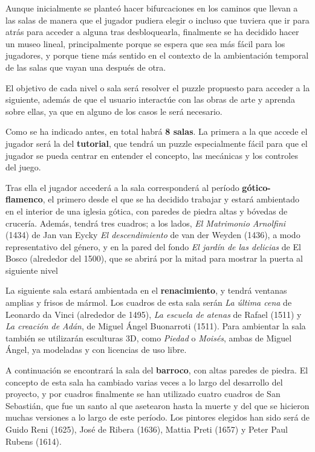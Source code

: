 Aunque inicialmente se planteó hacer bifurcaciones en los caminos que llevan a las salas de manera que el jugador pudiera elegir o incluso que tuviera que ir para atrás para acceder a alguna tras desbloquearla, finalmente se ha decidido hacer un museo lineal, principalmente porque se espera que sea más fácil para los jugadores, y porque tiene más sentido en el contexto de la ambientación temporal de las salas que vayan una después de otra.

El objetivo de cada nivel o sala será resolver el puzzle propuesto para acceder a la siguiente, además de que el usuario interactúe con las obras de arte y aprenda sobre ellas, ya que en alguno de los casos le será necesario.

Como se ha indicado antes, en total habrá \textbf{8 salas}. La primera a la que accede el jugador será la del \textbf{tutorial}, que tendrá un puzzle especialmente fácil para que el jugador se pueda centrar en entender el concepto, las mecánicas y los controles del juego.

Tras ella el jugador accederá a la sala corresponderá al período \textbf{gótico-flamenco}, el primero desde el que se ha decidido trabajar y estará ambientado en el interior de una iglesia gótica, con paredes de piedra altas y bóvedas de crucería. Además, tendrá tres cuadros; a los lados, \textit{El Matrimonio Arnolfini} (1434)  de Jan van Eycky \textit{El descendimiento} de van der Weyden (1436), a modo representativo del género, y en la pared del fondo \textit{El jardín de las delicias} de El Bosco (alrededor del 1500), que se abrirá por la mitad para mostrar la puerta al siguiente nivel

La siguiente sala estará ambientada en el \textbf{renacimiento}, y tendrá ventanas amplias y frisos de mármol. Los cuadros de esta sala serán \textit{La última cena} de Leonardo da Vinci (alrededor de 1495), \textit{La escuela de atenas} de Rafael (1511) y \textit{La creación de Adán}, de Miguel Ángel Buonarroti (1511). Para ambientar la sala también se utilizarán esculturas 3D, como \textit{Piedad} o \textit{Moisés}, ambas de Miguel Ángel, ya modeladas y con licencias de uso libre.

A continuación se encontrará la sala del \textbf{barroco}, con altas paredes de piedra. El concepto de esta sala ha cambiado varias veces a lo largo del desarrollo del proyecto, y por cuadros finalmente se han utilizado cuatro cuadros de San Sebastián, que fue un santo al que asetearon hasta la muerte y del que se hicieron muchas versiones a lo largo de este período. Los pintores elegidos han sido será de Guido Reni (1625),  José de Ribera (1636), Mattia Preti (1657) y Peter Paul Rubens (1614).

